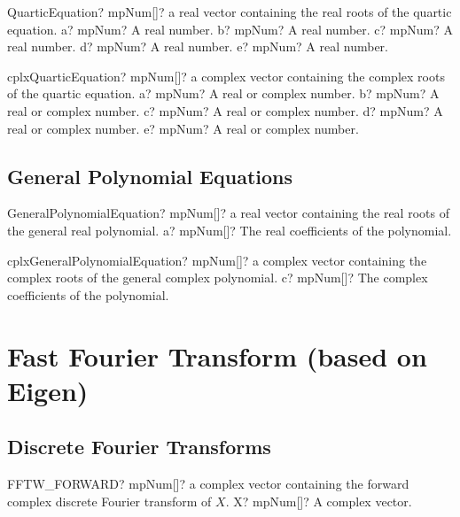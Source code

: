\documentclass[12pt,a4paper,openany]{book}
\begin{document}
\begin{mpFunctionsExtract}
\mpFunctionFive
{QuarticEquation? mpNum[]? a real vector containing the real roots of the quartic equation.}
{a? mpNum? A real number.}
{b? mpNum? A real number.}
{c? mpNum? A real number.}
{d? mpNum? A real number.}
{e? mpNum? A real number.}
\end{mpFunctionsExtract}

\begin{mpFunctionsExtract}
\mpFunctionFive
{cplxQuarticEquation? mpNum[]? a complex vector containing the complex roots of the quartic equation.}
{a? mpNum? A real or complex number.}
{b? mpNum? A real or complex number.}
{c? mpNum? A real or complex number.}
{d? mpNum? A real or complex number.}
{e? mpNum? A real or complex number.}
\end{mpFunctionsExtract}

\section{General Polynomial Equations}

\begin{mpFunctionsExtract}
\mpFunctionOne
{GeneralPolynomialEquation? mpNum[]? a real vector containing the real roots of the general real polynomial.}
{a? mpNum[]? The real coefficients of the polynomial.}
\end{mpFunctionsExtract}

\begin{mpFunctionsExtract}
\mpFunctionOne
{cplxGeneralPolynomialEquation? mpNum[]? a complex vector containing the complex roots of the general complex polynomial.}
{c? mpNum[]? The complex coefficients of the polynomial.}
\end{mpFunctionsExtract}

\chapter{Fast Fourier Transform (based on Eigen)}

\section{Discrete Fourier Transforms}

\begin{mpFunctionsExtract}
\mpFunctionOne
{FFTW\_FORWARD? mpNum[]? a complex vector containing the forward complex discrete Fourier transform of $X$.}
{X? mpNum[]? A complex vector.}
\end{mpFunctionsExtract}
\end{document}
